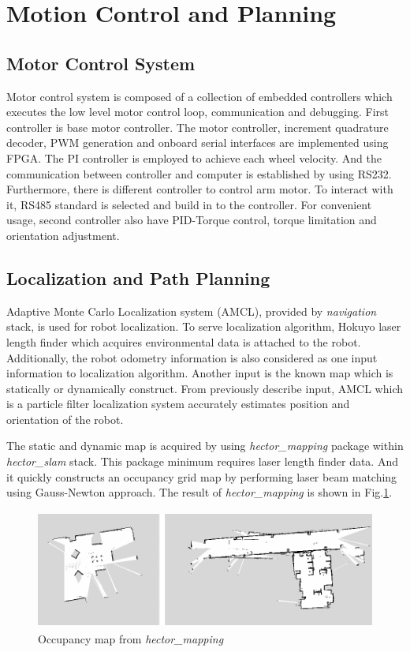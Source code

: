 \documentclass{llncs}
\begin{document}
\section{Motion Control and Planning}

\subsection{Motor Control System}

Motor control system is composed of a collection of embedded controllers which executes the low level motor control loop, communication and debugging. First controller is base motor controller. The motor controller, increment quadrature decoder, PWM generation and onboard serial interfaces are implemented using FPGA. The PI controller is employed to achieve each wheel velocity. And the communication between controller and computer is established by using RS232. Furthermore, there is different controller to control arm motor. To interact with it, RS485 standard is selected and build in to the controller. For convenient usage, second controller also have PID-Torque control, torque limitation and orientation adjustment. 

\subsection{Localization and Path Planning}

Adaptive Monte Carlo Localization system (AMCL), provided by \textit{navigation} stack, is used for robot localization. To serve localization algorithm, Hokuyo laser length finder which acquires environmental data is attached to the robot. Additionally, the robot odometry information is also considered as one input information to localization algorithm. Another input is the known map which is statically or dynamically construct. From previously describe input, AMCL which is a particle filter localization system accurately estimates position and orientation of the robot.

The static and dynamic map is acquired by using \textit{hector\_mapping} package within \textit{hector\_slam} stack. This package minimum requires laser length finder data. And it quickly constructs an occupancy grid map by performing laser beam matching using Gauss-Newton approach\cite{hector_slam}. The result of \textit{hector\_mapping} is shown in Fig.\ref{fig:hector}.

\begin{figure}
\centering
\includegraphics[height=3.9cm]{hector_map}
\caption{Occupancy map from \textit{hector\_mapping}}
\label{fig:hector}
\end{figure}
\end{document}
